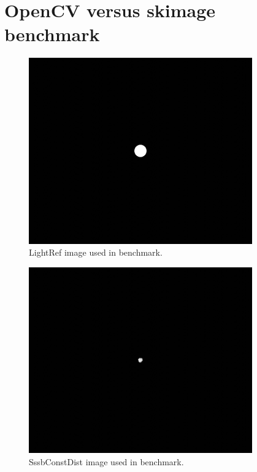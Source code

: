 \section{OpenCV versus \gls{skimage} benchmark} \label{sec:app_cvskimage}


\begin{figure}[htb]
    \begin{center}
        \includegraphics[height=8cm]{doc/thesis/0_figures/cv_skimage/LightRef_2017-08-15T115851-679000.jpg}
    \end{center}
    \caption{LightRef image used in benchmark.}
    \label{fig:bm_light_ref}
\end{figure}

\begin{figure}[htb]
    \begin{center}
        \includegraphics[height=8cm]{doc/thesis/0_figures/cv_skimage/SssbConstDist_2017-08-15T115851-679000.jpg}
    \end{center}
    \caption{SssbConstDist image used in benchmark.}
    \label{fig:bm_sssbconstdist}
\end{figure}

